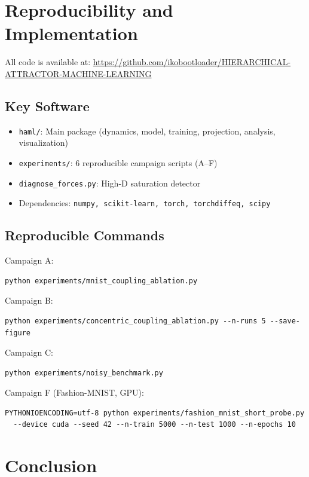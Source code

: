 \documentclass[11pt,a4paper]{article}
\begin{document}
\section{Reproducibility and Implementation}

All code is available at: \url{https://github.com/ikobootloader/HIERARCHICAL-ATTRACTOR-MACHINE-LEARNING}

\subsection{Key Software}

\begin{itemize}
  \item \texttt{haml/}: Main package (dynamics, model, training, projection, analysis, visualization)
  \item \texttt{experiments/}: 6 reproducible campaign scripts (A–F)
  \item \texttt{diagnose\_forces.py}: High-D saturation detector
  \item Dependencies: \texttt{numpy, scikit-learn, torch, torchdiffeq, scipy}
\end{itemize}

\subsection{Reproducible Commands}

Campaign A:
\begin{verbatim}
python experiments/mnist_coupling_ablation.py
\end{verbatim}

Campaign B:
\begin{verbatim}
python experiments/concentric_coupling_ablation.py --n-runs 5 --save-figure
\end{verbatim}

Campaign C:
\begin{verbatim}
python experiments/noisy_benchmark.py
\end{verbatim}

Campaign F (Fashion-MNIST, GPU):
\begin{verbatim}
PYTHONIOENCODING=utf-8 python experiments/fashion_mnist_short_probe.py 
  --device cuda --seed 42 --n-train 5000 --n-test 1000 --n-epochs 10
\end{verbatim}

\section{Conclusion}
\end{document}
